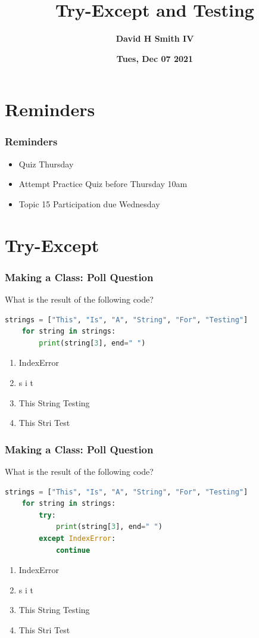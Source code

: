 \documentclass{beamer}
\title{\textbf{Try-Except and Testing}}
\author{\textbf{David H Smith IV}}
\institute[\textbf{UIUC}]{\textbf{University of Illinois Urbana-Champaign}}
\date{\textbf{Tues, Dec 07 2021}}
\begin{document}
\frame{\titlepage}

\section{Reminders}

%
%
\begin{frame}
    \frametitle{Reminders}
    \begin{itemize}
        \item Quiz Thursday
        \item Attempt Practice Quiz before Thursday 10am
        \item Topic 15 Participation due Wednesday
    \end{itemize}
\end{frame}

\section{Try-Except}

%
%
\begin{frame}[fragile]
    \frametitle{Making a Class: Poll Question}
    What is the result of the following code?
    \begin{lstlisting}[language=Python, autogobble]
    strings = ["This", "Is", "A", "String", "For", "Testing"]
    for string in strings:
        print(string[3], end=" ")
    \end{lstlisting}
    \vfill
    \begin{enumerate}[A]
        \item IndexError
        \item s i t
        \item This String Testing
        \item This Stri Test
    \end{enumerate}
\end{frame}


%
%
\begin{frame}[fragile]
    \frametitle{Making a Class: Poll Question}
    What is the result of the following code?
    \begin{lstlisting}[language=Python, autogobble]
    strings = ["This", "Is", "A", "String", "For", "Testing"]
    for string in strings:
        try:
            print(string[3], end=" ")
        except IndexError:
            continue
    \end{lstlisting}
    \vfill
    \begin{enumerate}[A]
        \item IndexError
        \item s i t
        \item This String Testing
        \item This Stri Test
    \end{enumerate}
\end{frame}
\end{document}
